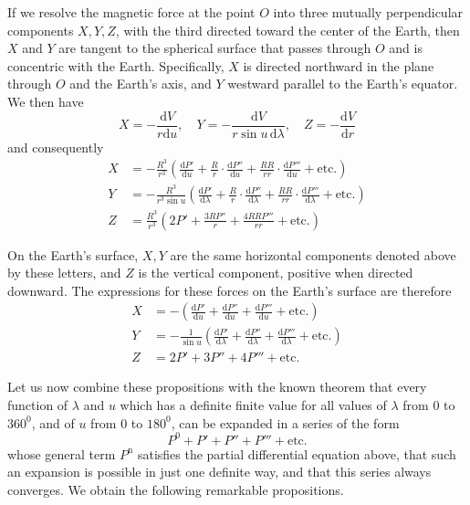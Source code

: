 If we resolve the magnetic force at the point $O$ into three mutually perpendicular components $X,Y,Z$, with the third directed toward the center of the Earth, then $X$ and $Y$ are tangent to the spherical surface that passes through $O$ and is concentric with the Earth. Specifically, $X$ is directed northward in the plane through $O$ and the Earth's axis, and $Y$ westward parallel to the Earth's equator. We then have
\[
X=-\frac{\mathrm{d}V}{r\mathrm{d}u},\quad Y=-\frac{\mathrm{d}V}{r\sin u\,\mathrm{d}\lambda},\quad Z=-\frac{\mathrm{d}V}{\mathrm{d}r}
\]
and consequently
\[
\begin{aligned}
X&=-\frac{R^3}{r^3}\left(\frac{\mathrm{d}P'}{\mathrm{d}u}+\frac Rr\cdot\frac{\mathrm{d}P''}{\mathrm{d}u}+\frac{RR}{rr}\cdot\frac{\mathrm{d}P'''}{\mathrm{d}u}+\text{etc.}\right)\\
Y&=-\frac{R^3}{r^3\sin u}\left(\frac{\mathrm{d}P'}{\mathrm{d}\lambda}+\frac Rr\cdot\frac{\mathrm{d}P''}{\mathrm{d}\lambda}+\frac{RR}{rr}\cdot\frac{\mathrm{d}P'''}{\mathrm{d}\lambda}+\text{etc.}\right)\\
Z&=\frac{R^3}{r^3}\left(2P'+\frac{3RP''}{r}+\frac{4RRP'''}{rr}+\text{etc.}\right)
\end{aligned}
\]

On the Earth's surface, $X,Y$ are the same horizontal components denoted above by these letters, and $Z$ is the vertical component, positive when directed downward. The expressions for these forces on the Earth's surface are therefore
\[
\begin{aligned}
X&=-\left(\frac{\mathrm{d}P'}{\mathrm{d}u}+\frac{\mathrm{d}P''}{\mathrm{d}u}+\frac{\mathrm{d}P'''}{\mathrm{d}u}+\text{etc.}\right)\\
Y&=-\frac1{\sin u}\left(\frac{\mathrm{d}P'}{\mathrm{d}\lambda}+\frac{\mathrm{d}P''}{\mathrm{d}\lambda}+\frac{\mathrm{d}P'''}{\mathrm{d}\lambda}+\text{etc.}\right)\\
Z&=2P'+3P''+4P'''+\text{etc.}
\end{aligned}
\]

Let us now combine these propositions with the known theorem that every function of $\lambda$ and $u$ which has a definite finite value for all values of $\lambda$ from $0$ to $360^0$, and of $u$ from $0$ to $180^0$, can be expanded in a series of the form
\[
P^0+P'+P''+P'''+\text{etc.}
\]
whose general term $P^{\mathrm{n}}$ satisfies the partial differential equation above, that such an expansion is possible in just one definite way, and that this series always converges. We obtain the following remarkable propositions.

